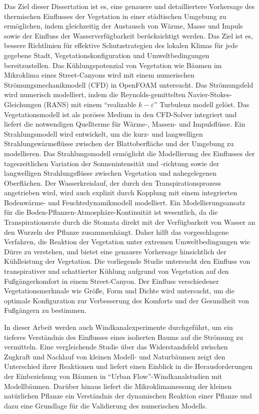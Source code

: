 Das Ziel dieser Dissertation ist es, eine genauere und detailliertere Vorhersage des thermischen Einflusses der Vegetation in einer städtischen Umgebung zu ermöglichen, indem gleichzeitig der Austausch von Wärme, Masse und Impuls sowie der Einfluss der Wasserverfügbarkeit berücksichtigt werden. Das Ziel ist es, bessere Richtlinien für effektive Schutzstrategien des lokalen Klimas für jede gegebene Stadt, Vegetationskonfiguration und Umweltbedingungen bereitzustellen. Das Kühlungspotenzial von Vegetation wie Bäumen im Mikroklima eines Street-Canyons wird mit einem numerischen Strömungsmechanikmodell (CFD) in OpenFOAM untersucht. Das Strömungsfeld wird numerisch modelliert, indem die Reynolds-gemittelten Navier-Stokes-Gleichungen (RANS) mit einem ``realizable $ k- \varepsilon $'' Turbulenz modell gelöst. Das Vegetationsmodell ist als poröses Medium in den CFD-Solver integriert und liefert die notwendigen Quellterme für Wärme-, Massen- und Impulsflüsse. Ein Strahlungsmodell wird entwickelt, um die kurz- und langwelligen Strahlungswärmeflüsse zwischen der Blattoberfläche und der Umgebung zu modellieren. Das Strahlungsmodell ermöglicht die Modellierung des Einflusses der tageszeitlichen Variation der Sonnenintensität und -richtung sowie der langwelligen Strahlungsflüsse zwischen Vegetation und nahegelegenen Oberflächen. Der Wasserkreislauf, der durch den Transpirationsprozess angetrieben wird, wird auch explizit durch Kopplung mit einem integrierten Bodenwärme- und Feuchtedynamikmodell modelliert. Ein Modellierungsansatz für die Boden-Pflanzen-Atmosphäre-Kontinuität ist wesentlich, da die Transpirationsrate durch die Stomata direkt mit der Verfügbarkeit von Wasser an den Wurzeln der Pflanze zusammenhängt. Daher hilft das vorgeschlagene Verfahren, die Reaktion der Vegetation unter extremen Umweltbedingungen wie Dürre zu verstehen, und bietet eine genauere Vorhersage hinsichtlich der Kühlleistung der Vegetation. Die vorliegende Studie untersucht den Einfluss von transpirativer und schattierter Kühlung aufgrund von Vegetation auf den Fußgängerkomfort in einem Street-Canyon. Der Einfluss verschiedener Vegetationsmerkmale wie Größe, Form und Dichte wird untersucht, um die optimale Konfiguration zur Verbesserung des Komforts und der Gesundheit von Fußgängern zu bestimmen.

In dieser Arbeit werden auch Windkanalexperimente durchgeführt, um ein tieferes Verständnis des Einflusses eines isolierten Baums auf die Strömung zu vermitteln. Eine vergleichende Studie über das Widerstandsfeld zwischen Zugkraft und Nachlauf von kleinen Modell- und Naturbäumen zeigt den Unterschied ihrer Reaktionen und liefert einen Einblick in die Herausforderungen der Einbeziehung von Bäumen in ``Urban Flow''-Windkanalstudien mit Modellbäumen. Darüber hinaus liefert die Mikroklimamessung der kleinen natürlichen Pflanze ein Verständnis der dynamischen Reaktion einer Pflanze und dazu eine Grundlage für die Validierung des numerischen Modells.


\vfill

\pagebreak

\endgroup

\vfill
